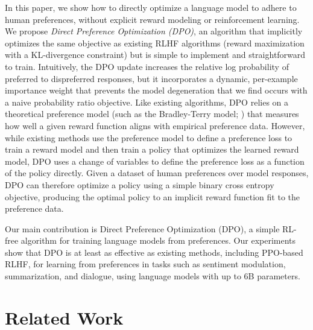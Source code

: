 In this paper, we show how to directly optimize a language model to adhere to human preferences, without explicit reward modeling or reinforcement learning. We propose
\textit{{Direct Preference Optimization} (DPO)}, an algorithm that implicitly optimizes the same objective as existing RLHF algorithms (reward maximization with a KL-divergence constraint) but is simple to implement and straightforward to train. Intuitively, the {DPO} update increases the relative log probability of preferred to dispreferred responses, but it incorporates a dynamic, per-example importance weight that prevents the model degeneration that we find occurs with a naive probability ratio objective. Like existing algorithms, {DPO} relies on a theoretical preference model (such as the Bradley-Terry model; \cite{bradley1952rankanalysis}) that measures how well a given reward function aligns with empirical preference data. However, while existing methods use the preference model to define a preference loss to train a reward model and then train a policy that optimizes the learned reward model, {DPO} uses a change of variables to define the preference loss as a function of the policy directly. Given a dataset of human preferences over model responses, {DPO} can therefore optimize a policy using a simple binary cross entropy objective, {producing the optimal policy to an implicit reward function fit to the preference data}.

Our main contribution is {Direct Preference Optimization} (DPO), a simple RL-free algorithm for training language models from preferences. Our experiments show that {DPO} is at least as effective as existing methods, including PPO-based RLHF, for learning from preferences in tasks such as sentiment modulation, summarization, and dialogue, using language models with up to 6B parameters.

\section{Related Work}

